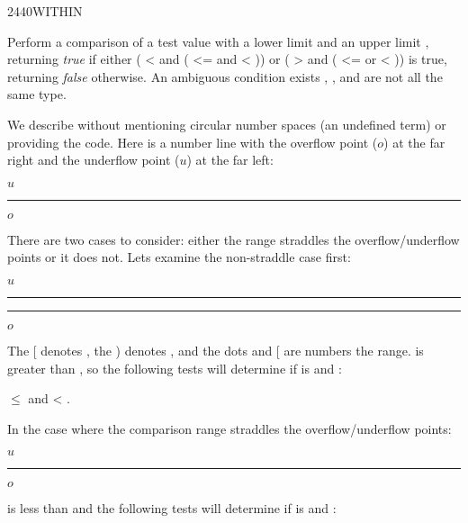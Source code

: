 \begin{worddef}{2440}{WITHIN}
\item {}

	Perform a comparison of a test value  with a
	lower limit  and an upper limit
	, returning \emph{true} if either
	( <   and
	( <=  and
	  <  )) or
	( >   and
	( <=  or
	  <  )) is true, returning
	\emph{false} otherwise. An ambiguous condition exists
	, , and  are not
	all the same type.

	\begin{defer}
	\rationale %
		We describe  without mentioning circular number
		spaces (an undefined term) or providing the code. Here is a
		number line with the overflow point ($o$) at the far right and
		the underflow point ($u$) at the far left:
		\begin{center}
			$u$\rule[.5ex]{15em}{.4pt}$o$
		\end{center}
		There are two cases to consider: either the
		 range straddles the overflow/underflow
		points or it does not. Lets examine the non-straddle case
		first:
		\begin{center}
			$u$\rule[.5ex]{5em}{.4pt}\makebox[5em]{[\dotfill)}\rule[.5ex]{5em}{.4pt}$o$
		\end{center}
		The [ denotes , the ) denotes ,
		and the dots and [ are numbers  the range.
		 is greater than , so the
		following tests will determine if  is
		  and :
		\begin{center}
			 $\le$  and  < .
		\end{center}
		In the case where the comparison range straddles the
		overflow/underflow points:
		\begin{center}
			$u$\makebox[5em]{\dotfill)}\rule[.5ex]{5em}{.4pt}\makebox[5em]{[\dotfill}$o$
		\end{center}
		 is less than  and the following
		tests will determine if  is 
		 and :
		\begin{center}

\end{center}
\end{defer}
\end{worddef}
